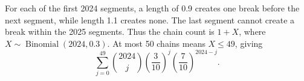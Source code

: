 For each of the first 2024 segments, a length of 0.9 creates one break before the next segment, while length 1.1 creates none. The last segment cannot create a break within the 2025 segments. Thus the chain count is $1+X$, where $X\sim\operatorname{Binomial}(2024,0.3)$. At most 50 chains means $X\le 49$, giving\[\boxed{\sum_{j=0}^{49}\binom{2024}{j}\left(\dfrac{3}{10}\right)^j\left(\dfrac{7}{10}\right)^{2024-j}}.\]
